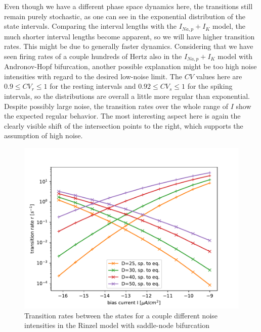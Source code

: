 \documentclass[12pt,a4paper]{article}
\begin{document}
Even though we have a different phase space dynamics here, the transitions still remain purely stochastic, as one can see in the exponential distribution of the state intervals.
Comparing the interval lengths with the $I_{Na,p}+I_K$ model, the much shorter interval lengths become apparent, so we will have higher transition rates. 
This might be due to generally faster dynamics. Considering that we have seen firing rates of a couple hundreds of Hertz also in the $I_{Na,p}+I_K$ model with Andronov-Hopf bifurcation, another possible explanation might be too high noise intensities with regard to the desired low-noise limit.
The $CV$ values here are $0.9\leq CV_r\leq 1$ for the resting intervals and $0.92\leq CV_s\leq 1$ for the spiking intervals, so the distributions are overall a little more regular than exponential.
\\
Despite possibly large noise, the transition rates over the whole range of $I$ show the expected regular behavior. The most interesting aspect here is again the clearly visible shift of the intersection points to the right, which supports the assumption of high noise.
\begin{figure}[H]
	\centering
	\includegraphics[scale=1]{tranratesrinzel.pdf}\caption{Transition rates between the states for a couple different noise intensities in the Rinzel model with saddle-node bifurcation}
	\label{tranratesrinzel}
\end{figure}
\end{document}
